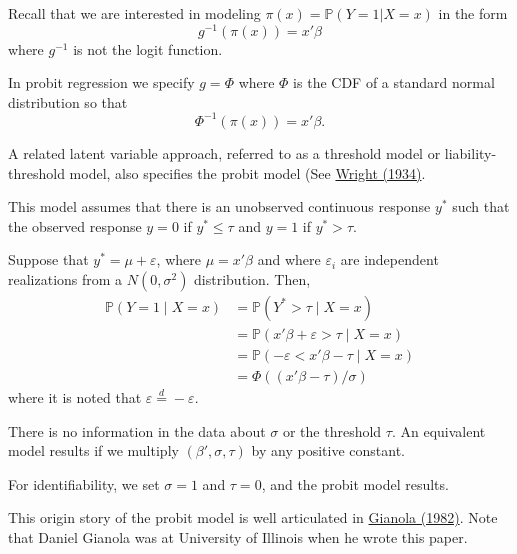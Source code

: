 \documentclass[
  ignorenonframetext,
]{beamer}
\begin{document}
\begin{frame}{}
\protect\hypertarget{section-6}{}
Recall that we are interested in modeling
\(\pi(x) = \mathbb{P}(Y = 1|X = x)\) in the form \[
  g^{-1}(\pi(x)) = x'\beta
\] where \(g^{-1}\) is not the logit function.

\vspace{12pt}

In probit regression we specify \(g = \Phi\) where \(\Phi\) is the CDF
of a standard normal distribution so that \[
  \Phi^{-1}(\pi(x)) = x'\beta.
\]
\end{frame}

\begin{frame}{}
\protect\hypertarget{section-7}{}
A related latent variable approach, referred to as a threshold model or
liability-threshold model, also specifies the probit model (See
\href{https://www.ncbi.nlm.nih.gov/pmc/articles/PMC1208511/}{Wright
(1934)}.

\vspace{12pt}

This model assumes that there is an unobserved continuous response
\(y^*\) such that the observed response \(y = 0\) if \(y^* \leq \tau\)
and \(y = 1\) if \(y^* > \tau\).

\vspace{12pt}

Suppose that \(y^* = \mu + \varepsilon\), where \(\mu = x'\beta\) and
where \(\varepsilon_i\) are independent realizations from a
\(N(0,\sigma^2)\) distribution. Then, \begin{align*}
  \mathbb{P}(Y = 1\mid X = x) &= \mathbb{P}(Y^* > \tau\mid X = x) \\ 
    &= \mathbb{P}(x'\beta + \varepsilon > \tau\mid X = x) \\
    &= \mathbb{P}(-\varepsilon < x'\beta - \tau\mid X = x) \\
    &= \Phi\left((x'\beta - \tau)/\sigma\right)
\end{align*} where it is noted that
\(\varepsilon \overset{d}{=} -\varepsilon\).
\end{frame}

\begin{frame}{}
\protect\hypertarget{section-8}{}
There is no information in the data about \(\sigma\) or the threshold
\(\tau\). An equivalent model results if we multiply
\((\beta',\sigma,\tau)\) by any positive constant.

\vspace{12pt}

For identifiability, we set \(\sigma = 1\) and \(\tau = 0\), and the
probit model results.

\vspace{12pt}

This origin story of the probit model is well articulated in
\href{https://academic.oup.com/jas/article-abstract/54/5/1079/4661768?redirectedFrom=fulltext}{Gianola
(1982)}. Note that Daniel Gianola was at University of Illinois when he
wrote this paper.
\end{frame}
\end{document}
